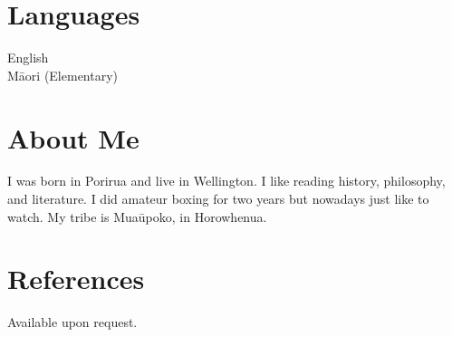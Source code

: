\documentclass[margin,line]{res}
\begin{document}
\begin{resume}
\section{\sc Languages}
English\\
M\=aori (Elementary)

\section{\sc About Me}
I was born in Porirua and live in Wellington. I like reading history, philosophy, and literature. I did amateur boxing for two years but nowadays just like to watch. My tribe is Mua\=upoko, in Horowhenua.

\section{\sc References}
Available upon request.

\end{resume}
\end{document}
